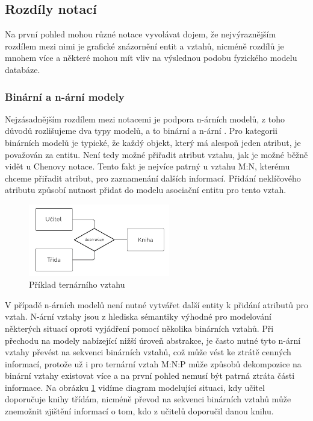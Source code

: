 \documentclass[czech,bachelor,public,dept460,male,oneside]{diploma}
\begin{document}
	\subsection{Rozdíly notací}
	Na první pohled mohou různé notace vyvolávat dojem, že nejvýraznějším rozdílem mezi nimi je grafické znázornění entit a vztahů, nicméně rozdílů je mnohem více a některé mohou mít vliv na výslednou podobu fyzického modelu databáze.
		
		\subsubsection{Binární a n-ární modely}
		Nejzásadnějším rozdílem mezi notacemi je podpora n-árních modelů, z toho důvodů rozlišujeme dva typy modelů, a to binární a n-ární \cite{compErNotations}. Pro kategorii binárních modelů je typické, že každý objekt, který má alespoň jeden atribut, je považován za entitu. Není tedy možné přiřadit atribut vztahu, jak je možné běžně vidět u Chenovy notace. Tento fakt je nejvíce patrný u vztahu M:N, kterému chceme přiřadit atribut, pro zaznamenání dalších informací. Přidání neklíčového atributu způsobí nutnost přidat do modelu asociační entitu pro tento vztah. 
		
		\begin{figure}[!h]
			\centering
			\includegraphics[width=0.55\textwidth]{Figures/TernaryRelationship2}
			\caption{Příklad ternárního vztahu}
			\label{fig:ternaryEx}
		\end{figure}
		
		V případě n-árních modelů není nutné vytvářet další entity k přidání atributů pro vztah. N-ární vztahy jsou z hlediska sémantiky výhodné pro modelování některých situací oproti vyjádření pomocí několika binárních vztahů. Při přechodu na modely nabízející nižší úroveň abstrakce, je často nutné tyto n-ární vztahy převést na sekvenci binárních vztahů, což může vést ke ztrátě cenných informací, protože už i pro ternární vztah M:N:P může způsobů dekompozice na binární vztahy existovat více a na první pohled nemusí být patrná ztráta části informace. Na obrázku \ref{fig:ternaryEx} vidíme diagram modelující situaci, kdy učitel doporučuje knihy třídám, nicméně převod na sekvenci binárních vztahů může znemožnit zjištění informací o tom, kdo z učitelů doporučil danou knihu.
		
\end{document}

